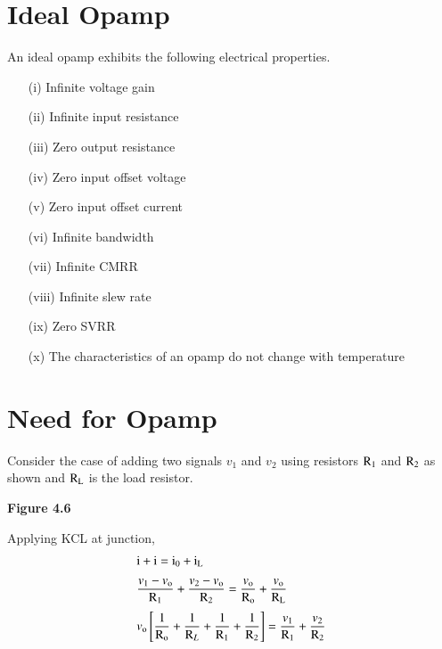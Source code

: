 \section{Ideal Opamp}\label{sec4.4}

An ideal opamp exhibits the following electrical properties.
\begin{itemize}
\item[(i)] Infinite voltage gain

\item[(ii)] Infinite input resistance

\item[(iii)] Zero output resistance

\item[(iv)] Zero input offset voltage

\item[(v)] Zero input offset current

\item[(vi)] Infinite bandwidth

\item[(vii)] Infinite CMRR

\item[(viii)] Infinite slew rate

\item[(ix)] Zero SVRR

\item[(x)] The characteristics of an opamp do not change with temperature
\end{itemize}

\section{Need for Opamp}\label{sec4.5}

Consider the case of adding two signals $v_{1}$ and $v_{2}$ using resistors $\textrm{R}_{1}$ and $\textrm{R}_{2}$ as shown and $\textrm{R}_{\textrm{L}}$ is the load resistor.
\begin{center}
{\bf Figure 4.6}
\end{center}

Applying KCL at junction,
\begin{align}
& \textrm{i} +\textrm{i}=\textrm{i}_{0}+\textrm{i}_{\textrm{L}}\label{eq4.9}\\[3pt]
& \frac{v_{1}-v_{\textrm{o}}}{\textrm{R}_{1}}+\frac{v_{2}-v_{\textrm{o}}}{\textrm{R}_{2}}=\frac{v_{\textrm{o}}}{\textrm{R}_{\textrm{o}}}+\frac{v_{\textrm{o}}}{\textrm{R}_{\textrm{L}}}\notag\\[3pt]
& v_{\textrm{o}}\left[\frac{1}{\textrm{R}_{\textrm{o}}}+\frac{1}{\textrm{R}_{L}}+\frac{1}{\textrm{R}_{1}}+\frac{1}{\textrm{R}_{2}}\right]=\frac{v_{1}}{\textrm{R}_{1}}+\frac{v_{2}}{\textrm{R}_{2}}\label{eq4.10}
\end{align}

